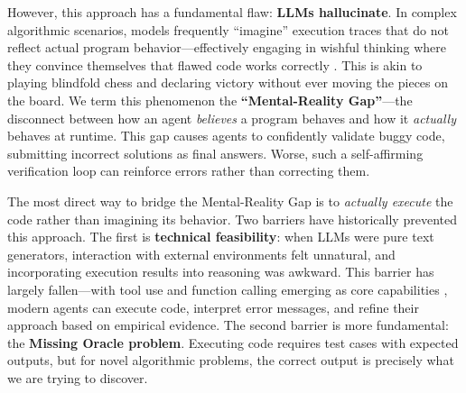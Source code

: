 \documentclass[11pt]{article}
\begin{document}
However, this approach has a fundamental flaw: \textbf{LLMs hallucinate}. In complex algorithmic scenarios, models frequently ``imagine'' execution traces that do not reflect actual program behavior---effectively engaging in wishful thinking where they convince themselves that flawed code works correctly \citep{huang2025survey}. This is akin to playing blindfold chess and declaring victory without ever moving the pieces on the board. We term this phenomenon the \textbf{``Mental-Reality Gap''}---the disconnect between how an agent \textit{believes} a program behaves and how it \textit{actually} behaves at runtime. This gap causes agents to confidently validate buggy code, submitting incorrect solutions as final answers. Worse, such a self-affirming verification loop can reinforce errors rather than correcting them.

The most direct way to bridge the Mental-Reality Gap is to \textit{actually execute} the code rather than imagining its behavior. Two barriers have historically prevented this approach. The first is \textbf{technical feasibility}: when LLMs were pure text generators, interaction with external environments felt unnatural, and incorporating execution results into reasoning was awkward. This barrier has largely fallen---with tool use and function calling emerging as core capabilities \citep{yao2022react, schick2024toolformer}, modern agents can execute code, interpret error messages, and refine their approach based on empirical evidence. The second barrier is more fundamental: the \textbf{Missing Oracle problem}. Executing code requires test cases with expected outputs, but for novel algorithmic problems, the correct output is precisely what we are trying to discover.
\end{document}
